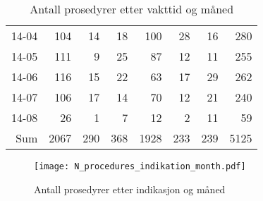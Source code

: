 \documentclass[presentation,xcolor=pdftex,dvipsnames,table]{beamer}
\begin{document}
\begin{frame}
\begin{tiny}
\begin{table}[ht]
\begin{tabular}{rrrrrrrr}
  14-04 & 104 & 14 & 18 & 100 & 28 & 16 & 280 \\ 
  14-05 & 111 & 9 & 25 & 87 & 12 & 11 & 255 \\ 
  14-06 & 116 & 15 & 22 & 63 & 17 & 29 & 262 \\ 
  14-07 & 106 & 17 & 14 & 70 & 12 & 21 & 240 \\ 
  14-08 & 26 & 1 & 7 & 12 & 2 & 11 & 59 \\ 
  Sum & 2067 & 290 & 368 & 1928 & 233 & 239 & 5125 \\ 
   \bottomrule
\end{tabular}
\caption{Antall prosedyrer etter vakttid og måned} 
\end{table}\end{tiny}
\end{frame}



\begin{frame}
\begin{figure}
  \centering
  \caption{Antall prosedyrer etter indikasjon og måned}
\texttt{[image: N\_procedures\_indikation\_month.pdf]}
\end{figure}\end{frame}
\end{document}
